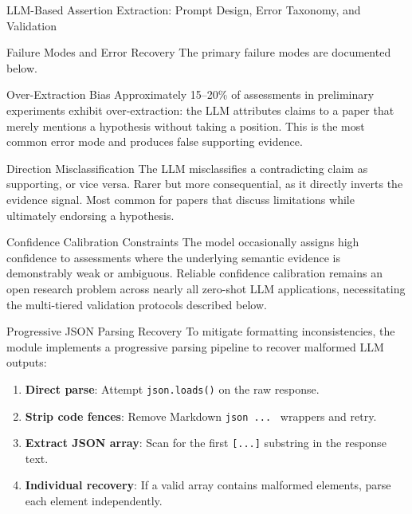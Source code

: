 \documentclass[
  ignorenonframetext,
]{beamer}
\providecommand{\tightlist}{%
  \setlength{\itemsep}{0pt}\setlength{\parskip}{0pt}}
\begin{document}
\begin{frame}[fragile]{LLM-Based Assertion Extraction: Prompt Design,
Error Taxonomy, and Validation \label{sec:extraction_pipeline}}
\begin{block}{Failure Modes and Error Recovery}
\protect{}\label{failure-modes-and-error-recovery}
The primary failure modes are documented below.

\begin{block}{Over-Extraction Bias}
\protect{}\label{over-extraction-bias}
Approximately 15--20\% of assessments in preliminary experiments exhibit
over-extraction: the LLM attributes claims to a paper that merely
mentions a hypothesis without taking a position. This is the most common
error mode and produces false supporting evidence.
\end{block}

\begin{block}{Direction Misclassification}
\protect{}\label{direction-misclassification}
The LLM misclassifies a contradicting claim as supporting, or vice
versa. Rarer but more consequential, as it directly inverts the evidence
signal. Most common for papers that discuss limitations while ultimately
endorsing a hypothesis.
\end{block}

\begin{block}{Confidence Calibration Constraints}
\protect{}\label{confidence-calibration-constraints}
The model occasionally assigns high confidence to assessments where the
underlying semantic evidence is demonstrably weak or ambiguous. Reliable
confidence calibration remains an open research problem across nearly
all zero-shot LLM applications, necessitating the multi-tiered
validation protocols described below.
\end{block}

\begin{block}{Progressive JSON Parsing Recovery}
\protect{}\label{progressive-json-parsing-recovery}
To mitigate formatting inconsistencies, the module implements a
progressive parsing pipeline to recover malformed LLM outputs:

\begin{enumerate}
\tightlist
\item
  \textbf{Direct parse}: Attempt \texttt{json.loads()} on the raw
  response.
\item
  \textbf{Strip code fences}: Remove Markdown
  \texttt{\textasciigrave{}\textasciigrave{}\textasciigrave{}json\ ...\ \textasciigrave{}\textasciigrave{}\textasciigrave{}}
  wrappers and retry.
\item
  \textbf{Extract JSON array}: Scan for the first \texttt{{[}...{]}}
  substring in the response text.
\item
  \textbf{Individual recovery}: If a valid array contains malformed
  elements, parse each element independently.
\end{enumerate}


\end{block}
\end{block}
\end{frame}
\end{document}
